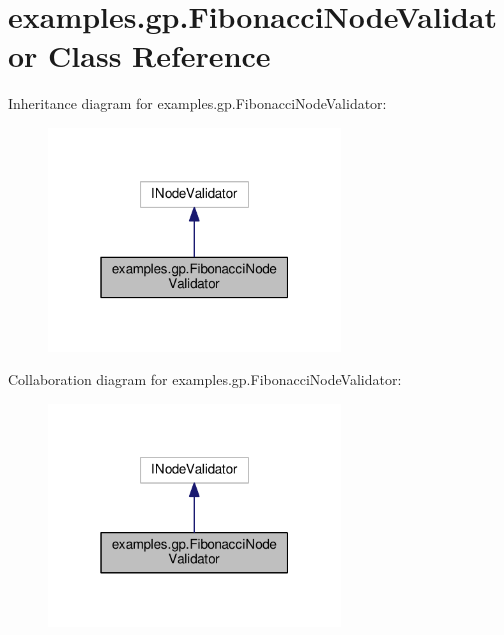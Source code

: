 \hypertarget{classexamples_1_1gp_1_1_fibonacci_node_validator}{\section{examples.\-gp.\-Fibonacci\-Node\-Validator Class Reference}
\label{classexamples_1_1gp_1_1_fibonacci_node_validator}
}


Inheritance diagram for examples.\-gp.\-Fibonacci\-Node\-Validator\-:
\nopagebreak
\begin{figure}[H]
\begin{center}
\leavevmode
\includegraphics[width=220pt]{classexamples_1_1gp_1_1_fibonacci_node_validator__inherit__graph}
\end{center}
\end{figure}


Collaboration diagram for examples.\-gp.\-Fibonacci\-Node\-Validator\-:
\nopagebreak
\begin{figure}[H]
\begin{center}
\leavevmode
\includegraphics[width=220pt]{classexamples_1_1gp_1_1_fibonacci_node_validator__coll__graph}
\end{center}
\end{figure}
